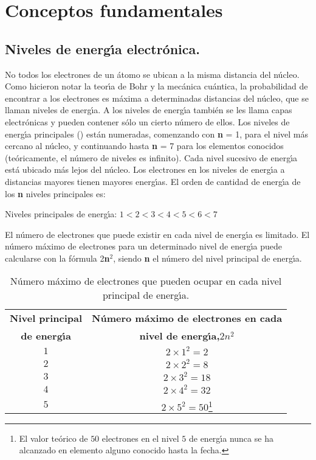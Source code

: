 \section{Conceptos fundamentales}\label{cfund}
\subsection{Niveles de energ\'{\i}a electr\'onica.}
No todos los electrones de un \'atomo se ubican a la misma distancia del n\'ucleo. Como hicieron notar la teor\'{\i}a de Bohr y la mec\'anica cu\'antica, la pro\-babilidad de encontrar a los electrones es m\'axima a determinadas distancias del n\'ucleo, que se llaman niveles de energ\'{\i}a. A los niveles de energ\'{\i}a tambi\'en se les llama capas electr\'onicas y pueden contener s\'olo un cierto n\'umero de ellos. Los niveles de energ\'{\i}a principales (\textbf{}) est\'an numeradas, comenzando con \textbf{n} = 1, para el nivel m\'as cercano al n\'ucleo, y continuando hasta  \textbf{n} = 7 para los elementos conocidos  (te\'oricamente, el n\'umero de niveles es infinito). Cada nivel sucesivo de energ\'{\i}a est\'a ubicado m\'as lejos del n\'ucleo. Los electrones en los niveles de energ\'{\i}a a distancias mayores tienen mayores energ\'{\i}as. El orden de cantidad de energ\'{\i}a de los \textbf{n}  niveles principales es: 

Niveles principales de energ\'{\i}a: $1< 2 < 3 < 4 < 5 < 6< 7$

El n\'umero de electrones que puede existir en cada nivel de energ\'{\i}a es limitado. El n\'umero m\'aximo de electrones para un determinado nivel de energ\'{\i}a puede calcularse con la f\'ormula 2\textbf{n}$^2$, siendo \textbf{n} el n\'umero del nivel principal de  energ\'{\i}a.

\begin{table}[hbt]
\caption[Electrones en el nivel principal de energ\'{\i}a]{N\'umero m\'aximo de
electrones que pueden ocupar en cada nivel principal de energ\'{\i}a.}
\label{tab1.cap3}
\begin{minipage}{\linewidth}
\begin{center}
\begin{tabular}{ cc }\hline
\textbf{Nivel principal} &\textbf{N\'umero m\'aximo de electrones en cada}\\
\textbf{de energ\'{\i}a}& \textbf{nivel de energ\'{\i}a,}$2n^2$\\ \hline
$1$&$2\times 1^2 = 2$\\
$2$&$2\times 2^2 = 8$\\
$3$&$2\times 3^2 = 18$\\
$4$&$2\times 4^2 = 32$\\
$5$&$2\times 5^2 = 50$\footnote{El valor te\'orico de $50$ electrones en el
nivel $5$ de energ\'{\i}a nunca se  ha alcanzado en elemento alguno conocido hasta la
fecha.}\\ \hline 
\end{tabular}
\end{center}
\end{minipage}
\end{table}


